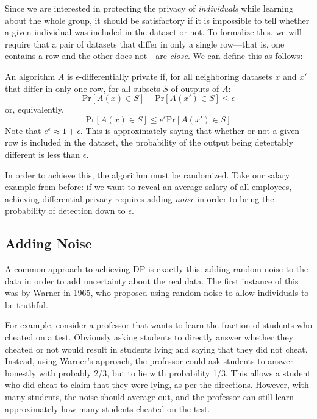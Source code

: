 Since we are interested in protecting the privacy of \emph{individuals} while learning about the whole group, it should be satisfactory if it is impossible to tell whether a given individual was included in the dataset or not. To formalize this, we will require that a pair of datasets that differ in only a single row---that is, one contains a row and the other does not---are \emph{close}. We can define this as follows:

\begin{definition}
	An algorithm $A$ is $\epsilon$-differentially private if, for all neighboring datasets $x$ and $x'$ that differ in only one row, for all subsets $S$ of outputs of $A$:
	\[ \text{Pr}[A(x) \in S] - \text{Pr}[A(x') \in S] \leq \epsilon  \]
	or, equivalently,
	\[ \text{Pr}[A(x) \in S] \leq e^\epsilon \text{Pr}[A(x') \in S] \]
	Note that $e^\epsilon \approx 1+\epsilon$. This is approximately saying that whether or not a given row is included in the dataset, the probability of the output being detectably different is less than $\epsilon$.
\end{definition}

In order to achieve this, the algorithm must be randomized. Take our salary example from before: if we want to reveal an average salary of all employees, achieving differential privacy requires adding \emph{noise} in order to bring the probability of detection down to $\epsilon$.

\subsection{Adding Noise}
A common approach to achieving DP is exactly this: adding random noise to the data in order to add uncertainty about the real data. The first instance of this was by Warner in 1965, who proposed using random noise to allow individuals to be truthful.

For example, consider a professor that wants to learn the fraction of students who cheated on a test. Obviously asking students to directly answer whether they cheated or not would result in students lying and saying that they did not cheat. Instead, using Warner's approach, the professor could ask students to answer honestly with probably 2/3, but to lie with probability 1/3. This allows a student who did cheat to claim that they were lying, as per the directions. However, with many students, the noise should average out, and the professor can still learn approximately how many students cheated on the test.

